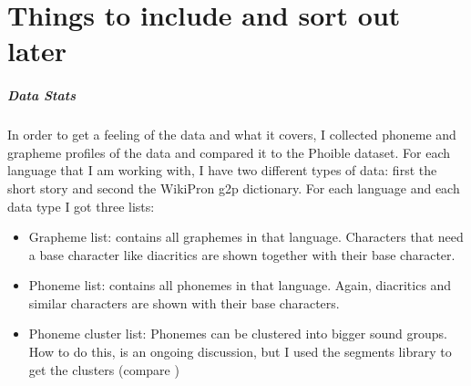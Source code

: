 

\section{Things to include and sort out later}
\subparagraph{Data Stats}
In order to get a feeling of the data and what it covers, I collected phoneme and grapheme profiles of the data and compared it to the Phoible dataset. For each language that I am working with, I have two different types of data: first the short story and second the WikiPron \ac{g2p} dictionary. For each language and each data type I got three lists:
\begin{itemize}
 \item Grapheme list: contains all graphemes in that language. Characters that need a base character like diacritics are shown together with their base character. 
 \item Phoneme list: contains all phonemes in that language. Again, diacritics and similar characters are shown with their base characters.
 \item Phoneme cluster list: Phonemes can be clustered into bigger sound groups. How to do this, is an ongoing discussion, but I used the segments library to get the clusters (compare \citet{unicode-lingu})
\end{itemize}

